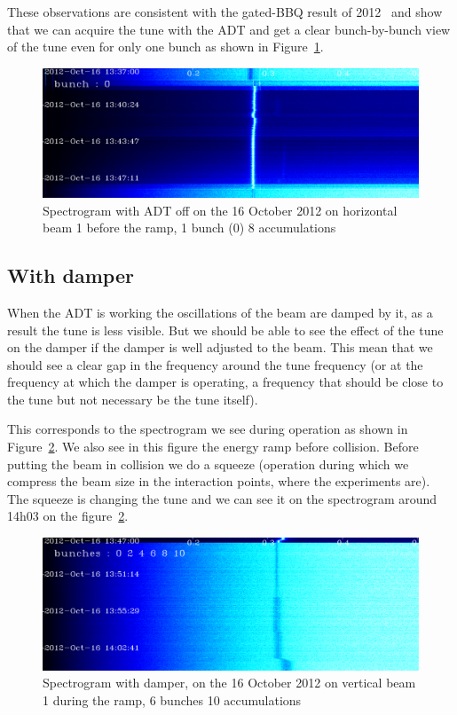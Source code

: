 These observations are consistent with the gated-\gls{BBQ} result of 2012~\cite{Valuch12} and show that we can acquire the tune with the \gls{ADT} and get a clear bunch-by-bunch view of the tune even for only one bunch as shown in Figure~\ref{fig:bunch_0_adt_off}.

\begin{figure}[H]
\caption{Spectrogram with ADT off on the 16 October 2012 on horizontal beam 1 before the ramp, 1 bunch (0) 8 accumulations}
\label{fig:bunch_0_adt_off}
\centering
\includegraphics[scale=0.3]{md-121016-hb1-m1-bunch000001-8acc-1337-1349.pdf}
\end{figure}

\subsection{With damper}

When the \gls{ADT} is working the oscillations of the beam are damped by it, as a result the tune is less visible. But we should be able to see the effect of the tune on the damper if the damper is well adjusted to the beam. This mean that we should see a clear gap in the frequency around the tune frequency (or at the frequency at which the damper is operating, a frequency that should be close to the tune but not necessary be the tune itself).

This corresponds to the spectrogram we see during operation as shown in Figure~\ref{fig:ramp}. We also see in this figure the energy ramp before collision. Before putting the beam in collision we do a squeeze (operation during which we compress the beam size in the interaction points, where the experiments are). The squeeze is changing the tune and we can see it on the spectrogram around 14h03 on the figure~\ref{fig:ramp}.

\begin{figure}[H]
\caption{Spectrogram with damper, on the 16 October 2012 on vertical beam 1 during the ramp, 6 bunches 10 accumulations}
\centering
\label{fig:ramp}
\includegraphics[scale=0.3]{md-121016-vb1-m1-6bunches-10acc-1347-1405-ramp.pdf}
\end{figure}

